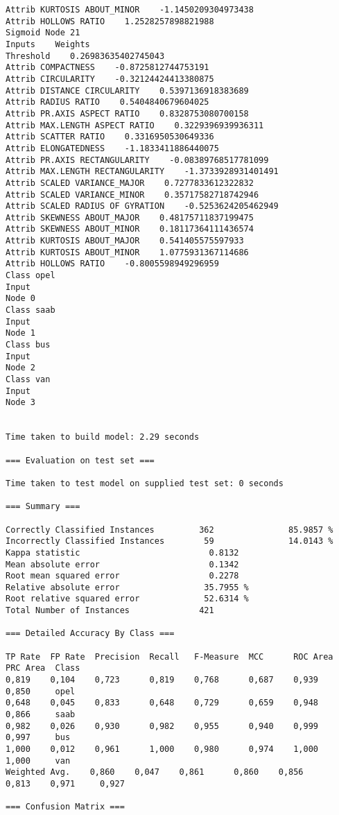 \documentclass[
	article,			%
	11pt,				%
	oneside,			%
	a4paper,			%
	english,			%
	brazil,				%
	sumario=tradicional
	]{abntex2}
\begin{document}
\begin{lstlisting}
Attrib KURTOSIS ABOUT_MINOR    -1.1450209304973438
Attrib HOLLOWS RATIO    1.2528257898821988
Sigmoid Node 21
Inputs    Weights
Threshold    0.26983635402745043
Attrib COMPACTNESS    -0.8725812744753191
Attrib CIRCULARITY    -0.32124424413380875
Attrib DISTANCE CIRCULARITY    0.5397136918383689
Attrib RADIUS RATIO    0.5404840679604025
Attrib PR.AXIS ASPECT RATIO    0.8328753080700158
Attrib MAX.LENGTH ASPECT RATIO    0.3229396939936311
Attrib SCATTER RATIO    0.3316950530649336
Attrib ELONGATEDNESS    -1.1833411886440075
Attrib PR.AXIS RECTANGULARITY    -0.08389768517781099
Attrib MAX.LENGTH RECTANGULARITY    -1.3733928931401491
Attrib SCALED VARIANCE_MAJOR    0.7277833612322832
Attrib SCALED VARIANCE_MINOR    0.35717582718742946
Attrib SCALED RADIUS OF GYRATION    -0.5253624205462949
Attrib SKEWNESS ABOUT_MAJOR    0.48175711837199475
Attrib SKEWNESS ABOUT_MINOR    0.18117364111436574
Attrib KURTOSIS ABOUT_MAJOR    0.541405575597933
Attrib KURTOSIS ABOUT_MINOR    1.0775931367114686
Attrib HOLLOWS RATIO    -0.8005598949296959
Class opel
Input
Node 0
Class saab
Input
Node 1
Class bus
Input
Node 2
Class van
Input
Node 3


Time taken to build model: 2.29 seconds

=== Evaluation on test set ===

Time taken to test model on supplied test set: 0 seconds

=== Summary ===

Correctly Classified Instances         362               85.9857 %
Incorrectly Classified Instances        59               14.0143 %
Kappa statistic                          0.8132
Mean absolute error                      0.1342
Root mean squared error                  0.2278
Relative absolute error                 35.7955 %
Root relative squared error             52.6314 %
Total Number of Instances              421     

=== Detailed Accuracy By Class ===

TP Rate  FP Rate  Precision  Recall   F-Measure  MCC      ROC Area  PRC Area  Class
0,819    0,104    0,723      0,819    0,768      0,687    0,939     0,850     opel
0,648    0,045    0,833      0,648    0,729      0,659    0,948     0,866     saab
0,982    0,026    0,930      0,982    0,955      0,940    0,999     0,997     bus
1,000    0,012    0,961      1,000    0,980      0,974    1,000     1,000     van
Weighted Avg.    0,860    0,047    0,861      0,860    0,856      0,813    0,971     0,927     

=== Confusion Matrix ===


\end{lstlisting}
\end{document}
